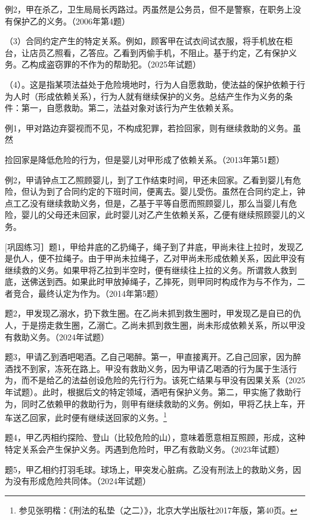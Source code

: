 例2，甲在杀乙，卫生局局长丙路过。丙虽然是公务员，但不是警察，在职务上没有保护乙的义务。（2006年第4题）

（3）合同约定产生的特定关系。例如，顾客甲在试衣间试衣服，将手机放在柜台，让店员乙照看，乙答应。乙看到丙偷手机，不阻止。基于约定，乙有保护义务。乙构成盗窃罪的不作为的帮助犯。（2025年试题）

（4）。这是指某项法益处于危险境地时，行为人自愿救助，使法益的保护依赖于行为人时（形成依赖关系），行为人就有继续保护的义务。总结产生作为义务的条件：第一，自愿救助。第二，法益对象对该行为产生依赖关系。

例1，甲对路边弃婴视而不见，不构成犯罪，若捡回家，则有继续救助的义务。虽然

捡回家是降低危险的行为，但是婴儿对甲形成了依赖关系。（2013年第51题）

例2，甲请钟点工乙照顾婴儿，到了工作结束时间，甲还未回家。乙看到婴儿有危险，但认为到了合同约定的下班时间，便离去。婴儿受伤。虽然在合同约定上，钟点工乙没有继续救助义务，但是，乙基于平等自愿而照顾婴儿，那么当婴儿有危险，婴儿的父母还未回家，此时婴儿对乙产生依赖关系，乙便有继续照顾婴儿的义务。

[巩固练习］题1，甲给井底的乙扔绳子，绳子到了井底，甲尚未往上拉时，发现乙是仇人，便不拉绳子。由于甲尚未拉绳子，乙对甲尚未形成依赖关系，因此甲没有继续救的义务。如果甲将乙拉到半空时，便有继续往上拉的义务。所谓救人救到底，送佛送到西。如果此时甲放掉绳子，乙摔死，则甲同时构成作为与不作为，二者竞合，最终认定为作为。（2014年第5题）

题2，甲发现乙溺水，扔下救生圈。在乙尚未抓到救生圈时，甲发现乙是自已的仇人，于是捞走救生圈，乙溺亡。乙尚未抓到救生圈，尚未形成依赖关系，所以甲没有救助义务。（2024年试题）

题3，甲请乙到酒吧喝酒。乙自己喝醉。第一，甲直接离开。乙自己回家，因为醉酒找不到家，冻死在路上。甲没有救助义务，因为甲请乙喝酒的行为属于生活行为，而不是给乙的法益创设危险的先行行为。该死亡结果与甲没有因果关系（2025年试题）。此时，根据后文的特定领域，酒吧有保护义务。第二，甲实施了救助行为，同时乙依赖甲的救助行为，则甲有继续救助的义务。例如，甲将乙扶上车，开车送乙回家，此时便有继续送回家的义务。\footnote{参见张明楷：《刑法的私垫（之二）》，北京大学出版社2017年版，第40页。}

题4，甲乙丙相约探险、登山（比较危险的山），意味着愿意相互照顾，形成，这种特定关系会产生保护义务。丙遇到危险时，甲乙有救助义务。（2023年试题）

题5，甲乙相约打羽毛球。球场上，甲突发心脏病。乙没有刑法上的救助义务，因为没有形成危险共同体。（2024年试题）

